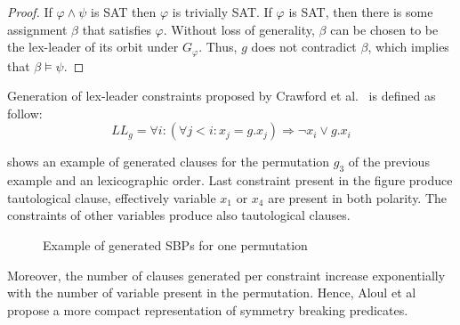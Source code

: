 \begin{proof}
	If $\varphi \wedge \psi$ is SAT then $\varphi$ is trivially SAT. If
	$\varphi$ is SAT, then there is some assignment $\beta$ that satisfies $\varphi$.
	Without loss of generality, $\beta$ can be chosen to be the lex-leader of its
	orbit under $G_{\varphi}$. Thus, $g$ does not contradict $\beta$, which implies that
	$\beta \models \psi$.
\end{proof}






%
%
%


Generation of lex-leader constraints proposed by Crawford et al.~\cite{crawford1996symmetry} is defined as follow:
$$ LL_g = \forall i : (\forall j < i : x_j = g.x_j) \Rightarrow  \neg x_i \lor g.x_i$$

 
  shows an example of generated clauses for the  permutation $g_3$ of the previous 
 example and an lexicographic order. Last constraint present in the figure produce tautological clause,
 effectively variable $x_1$ or $x_4$ are present in both polarity. The constraints of other variables produce 
 also tautological clauses. 
 
 
 \begin{figure}[!htbp]
 	
 	\caption{Example of generated SBPs for one permutation}
 	\label{fig:esbp_gen}
 \end{figure}
 
 
 Moreover, the number of clauses generated per constraint increase exponentially with the number of variable present in the permutation.
  Hence, Aloul et al~\cite{aloul06} propose a more compact representation of  symmetry breaking predicates.
 
